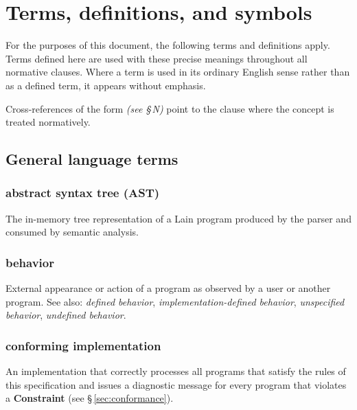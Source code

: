 \chapter{Terms, definitions, and symbols}
\label{sec:terms}

\pnum
For the purposes of this document, the following terms and definitions
apply.  Terms defined here are used with these precise meanings throughout
all normative clauses.  Where a term is used in its ordinary English sense
rather than as a defined term, it appears without emphasis.

\begin{note}
  Cross-references of the form \textit{(see \S\,N)} point to the clause
  where the concept is treated normatively.
\end{note}

\section{General language terms}
\label{sec:terms.general}

\subsection*{abstract syntax tree (AST)}
The in-memory tree representation of a Lain program produced by the parser
and consumed by semantic analysis.

\subsection*{behavior}
External appearance or action of a program as observed by a user or
another program.  See also: \textit{defined behavior},
\textit{implementation-defined behavior}, \textit{unspecified behavior},
\textit{undefined behavior}.

\subsection*{conforming implementation}
An implementation that correctly processes all programs that satisfy the
rules of this specification and issues a diagnostic message for every
program that violates a \textbf{Constraint} (see \S\,\ref{sec:conformance}).

